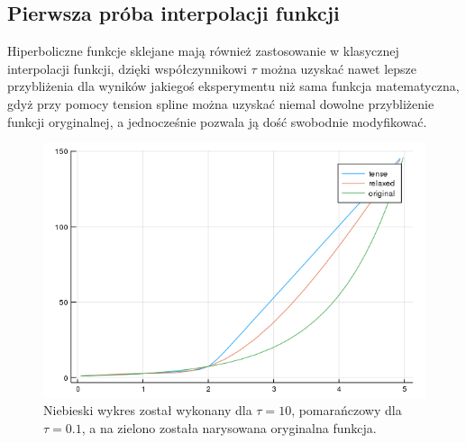 \documentclass{article}
\begin{document}
\subsection{Pierwsza próba interpolacji funkcji}
Hiperboliczne funkcje sklejane mają również zastosowanie w klasycznej interpolacji funkcji, dzięki współczynnikowi $\tau$ można uzyskać nawet lepsze przybliżenia dla wyników jakiegoś eksperymentu niż sama funkcja matematyczna, gdyż przy pomocy tension spline można uzyskać niemal dowolne przybliżenie funkcji oryginalnej, a jednocześnie pozwala ją dość swobodnie modyfikować.
\begin{figure}[ht]
  \begin{center}
  \includegraphics[width=15cm]{edox}
  \end{center}
  \caption{Niebieski wykres został wykonany dla $\tau = 10$, pomarańczowy dla $\tau = 0.1$, a na zielono została narysowana oryginalna funkcja.}
  \label{fig:rysunek}
\end{figure}
\newpage
\end{document}
